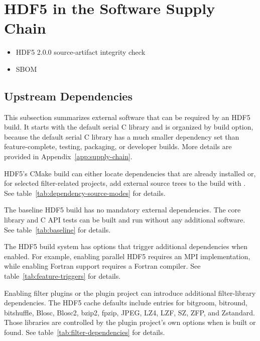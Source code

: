 \documentclass[../main.tex]{subfiles}
\begin{document}
\section{HDF5 in the Software Supply Chain}
\label{sec:supply-chain}


\begin{itemize}
    \item HDF5 2.0.0 source-artifact integrity check~\cite{prisupp-2204}
    \item SBOM
\end{itemize}

\subsection{Upstream Dependencies}

This subsection summarizes external software that can be required by an HDF5
build. It starts with the default serial C library and is organized by build
option, because the default serial C library has a much smaller dependency
set than feature-complete, testing, packaging, or developer builds. More
details are provided in Appendix~\ref{app:supply-chain}.

HDF5's CMake build can either locate dependencies that are already installed or,
for selected filter-related projects, add external source trees to the build with
. See table~\ref{tab:dependency-source-modes} for details. 

The baseline HDF5 build has no mandatory external dependencies.
The core library and C API tests can be built and run without any additional
software. See table~\ref{tab:baseline} for details.

The HDF5 build system has options that trigger additional dependencies when
enabled. For example, enabling parallel HDF5 requires an MPI implementation,
while enabling Fortran support requires a Fortran compiler.
See table~\ref{tab:feature-triggers} for details.

Enabling filter plugins or the plugin project can introduce additional
filter-library dependencies. The HDF5 cache defaults include entries for
bitgroom, bitround, bitshuffle, Blosc, Blosc2, bzip2, fpzip, JPEG, LZ4, LZF, SZ, ZFP, and Zstandard. Those libraries
are controlled by the plugin project's own options when 
is built or found. See table~\ref{tab:filter-dependencies} for details.
\end{document}
